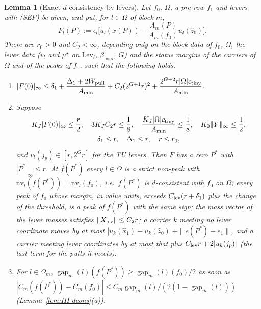 \documentclass[10pt]{amsart}
\newtheorem{lemma}[theorem]{Lemma}
\theoremstyle{definition}
\theoremstyle{remark}
\newcommand{\gap}{\operatorname{gap}}
\newcommand{\zh}{\hat z}
\begin{document}
\begin{lemma}[Exact $d$-consistency by levers]\label{lem:III-DC}
Let $f_0$, $\Omega$, a pre-row $f_1$ and levers with \textup{(SEP)} be given, and
put, for $l\in\Omega$ of block $m$,
\[
 F_l(P):=\epsilon_l\Big[u_l(\hat x(P))-\frac{A_m(P)}{A_m(f_0)}u_l(\zh_0)\Big].
\]
There are $r_0>0$ and $C_2<\infty$, depending only on the block data of $f_0$,
$\Omega$, the lever data \textup{(}$v_l$ and $\mu^\star$ on $\mathrm{Lev}_l$,
$\beta_{\max}$, $G$\textup{)} and the status margins of the carriers of $\Omega$
and of the peaks of $f_0$, such that the following holds.
\begin{enumerate}
\item[(i)] $|F(0)|_\infty\le\delta_1+\dfrac{\Delta_1+2W_{\rm pull}}{A_{\min}}+
C_2(2^{G+1}r)^2+\dfrac{2^{G+2}r|\Omega|c_{\rm tiny}}{A_{\min}}$.
\item[(ii)] Suppose
\begin{gather*}
 K_J|F(0)|_\infty\le\frac r2,\quad 3K_JC_2r\le\frac18,\quad
 \frac{K_J|\Omega|c_{\rm tiny}}{A_{\min}}\le\frac18,\quad K_0\|Y\|_\infty\le\frac12,\\
 \delta_1\le r,\quad\Delta_1\le r,\quad r\le r_0,
\end{gather*}
and $v_l(j_p)\in[r,2^Gr]$ for the TU levers.  Then $F$ has a zero $P^*$ with
$|P^*|_\infty\le r$.  At $f(P^*)$ every $l\in\Omega$ is a strict non-peak with
$\mathrm{nv}_l(f(P^*))=\mathrm{nv}_l(f_0)$, i.e.\ $f(P^*)$ is $d$-consistent with
$f_0$ on $\Omega$; every peak of $f_0$ whose margin, in value units, exceeds
$C_{\rm lev}(r+\delta_1)$ plus the change of the threshold, is a peak of
$f(P^*)$ with the same sign; the mass vector of the lever masses satisfies
$\|X_{\rm lev}\|\le C_2r$; a carrier $k$ meeting no lever coordinate moves by at
most $|u_k(\hat x_1)-u_k(\zh_0)|+\|e(P^*)-e_1\|$, and a carrier meeting lever
coordinates by at most that plus $C_{\rm lev}r+2|u_k(j_p)|$ \textup{(}the last
term for the pulls it meets\textup{)}.
\item[(iii)] For $l\in\Omega_m$, $\gap_m(l)(f(P^*))\ge\gap_m(l)(f_0)/2$ as soon
as $|C_m(f(P^*))-C_m(f_0)|\le C_m\gap_m(l)/(2(1-\gap_m(l)))$
\textup{(}Lemma~\ref{lem:III-dcons}(a)\textup{)}.
\end{enumerate}
\end{lemma}
\end{document}
